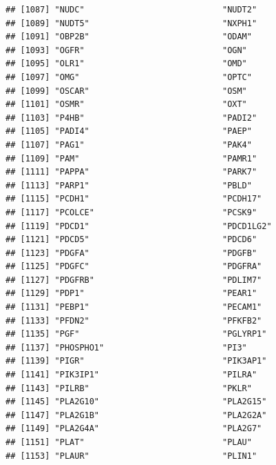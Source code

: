 \documentclass[
]{article}
\begin{document}
\begin{verbatim}
## [1087] "NUDC"                            "NUDT2"                          
## [1089] "NUDT5"                           "NXPH1"                          
## [1091] "OBP2B"                           "ODAM"                           
## [1093] "OGFR"                            "OGN"                            
## [1095] "OLR1"                            "OMD"                            
## [1097] "OMG"                             "OPTC"                           
## [1099] "OSCAR"                           "OSM"                            
## [1101] "OSMR"                            "OXT"                            
## [1103] "P4HB"                            "PADI2"                          
## [1105] "PADI4"                           "PAEP"                           
## [1107] "PAG1"                            "PAK4"                           
## [1109] "PAM"                             "PAMR1"                          
## [1111] "PAPPA"                           "PARK7"                          
## [1113] "PARP1"                           "PBLD"                           
## [1115] "PCDH1"                           "PCDH17"                         
## [1117] "PCOLCE"                          "PCSK9"                          
## [1119] "PDCD1"                           "PDCD1LG2"                       
## [1121] "PDCD5"                           "PDCD6"                          
## [1123] "PDGFA"                           "PDGFB"                          
## [1125] "PDGFC"                           "PDGFRA"                         
## [1127] "PDGFRB"                          "PDLIM7"                         
## [1129] "PDP1"                            "PEAR1"                          
## [1131] "PEBP1"                           "PECAM1"                         
## [1133] "PFDN2"                           "PFKFB2"                         
## [1135] "PGF"                             "PGLYRP1"                        
## [1137] "PHOSPHO1"                        "PI3"                            
## [1139] "PIGR"                            "PIK3AP1"                        
## [1141] "PIK3IP1"                         "PILRA"                          
## [1143] "PILRB"                           "PKLR"                           
## [1145] "PLA2G10"                         "PLA2G15"                        
## [1147] "PLA2G1B"                         "PLA2G2A"                        
## [1149] "PLA2G4A"                         "PLA2G7"                         
## [1151] "PLAT"                            "PLAU"                           
## [1153] "PLAUR"                           "PLIN1"                          

\end{verbatim}
\end{document}
